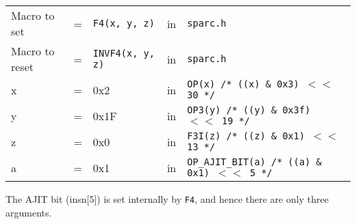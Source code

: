 \begin{enumerate}
  \begin{tabular}[h]{lclcl}
    Macro to set  &=& \texttt{F4(x, y, z)} &in& \texttt{sparc.h}     \\
    Macro to reset  &=& \texttt{INVF4(x, y, z)} &in& \texttt{sparc.h}     \\
    x &=& 0x2      &in& \texttt{OP(x)  /* ((x) \& 0x3)  $<<$ 30 */} \\
    y &=& 0x1F     &in& \texttt{OP3(y) /* ((y) \& 0x3f) $<<$ 19 */} \\
    z &=& 0x0      &in& \texttt{F3I(z) /* ((z) \& 0x1)  $<<$ 13 */} \\
    a &=& 0x1      &in& \texttt{OP\_AJIT\_BIT(a) /* ((a) \& 0x1)  $<<$ 5 */}
  \end{tabular}

  The AJIT bit  (insn[5]) is set internally by  \texttt{F4}, and hence
  there are only three arguments.
\end{enumerate}

